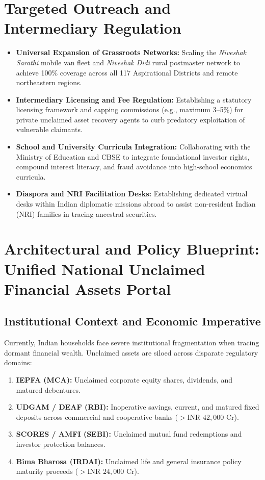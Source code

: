 \documentclass[openany]{book}
\begin{document}
\section{Targeted Outreach and Intermediary Regulation}
\begin{itemize}
    \item \textbf{Universal Expansion of Grassroots Networks:} Scaling the \textit{Niveshak Sarathi} mobile van fleet and \textit{Niveshak Didi} rural postmaster network to achieve 100\% coverage across all 117 Aspirational Districts and remote northeastern regions.
    \item \textbf{Intermediary Licensing and Fee Regulation:} Establishing a statutory licensing framework and capping commissions (e.g., maximum 3--5\%) for private unclaimed asset recovery agents to curb predatory exploitation of vulnerable claimants.
    \item \textbf{School and University Curricula Integration:} Collaborating with the Ministry of Education and CBSE to integrate foundational investor rights, compound interest literacy, and fraud avoidance into high-school economics curricula.
    \item \textbf{Diaspora and NRI Facilitation Desks:} Establishing dedicated virtual desks within Indian diplomatic missions abroad to assist non-resident Indian (NRI) families in tracing ancestral securities.
\end{itemize}

\section{Architectural and Policy Blueprint: Unified National Unclaimed Financial Assets Portal}

\subsection{Institutional Context and Economic Imperative}
Currently, Indian households face severe institutional fragmentation when tracing dormant financial wealth. Unclaimed assets are siloed across disparate regulatory domains:
\begin{enumerate}
    \item \textbf{IEPFA (MCA):} Unclaimed corporate equity shares, dividends, and matured debentures.
    \item \textbf{UDGAM / DEAF (RBI):} Inoperative savings, current, and matured fixed deposits across commercial and cooperative banks ($> \text{INR } 42,000\text{ Cr}$).
    \item \textbf{SCORES / AMFI (SEBI):} Unclaimed mutual fund redemptions and investor protection balances.
    \item \textbf{Bima Bharosa (IRDAI):} Unclaimed life and general insurance policy maturity proceeds ($> \text{INR } 24,000\text{ Cr}$).
\end{enumerate}
\end{document}
